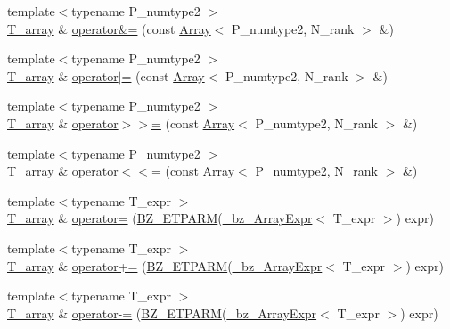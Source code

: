 \begin{DoxyCompactItemize}
{\footnotesize template$<$typename P\+\_\+numtype2 $>$ }\\\hyperlink{classArray_a6a3d9b6a214107a10df219091801f1e0}{T\+\_\+array} \& \hyperlink{classArray_a3098042fde0928d09b9aed56ce3566d0}{operator\&=} (const \hyperlink{classArray}{Array}$<$ P\+\_\+numtype2, N\+\_\+rank $>$ \&)
\item 
{\footnotesize template$<$typename P\+\_\+numtype2 $>$ }\\\hyperlink{classArray_a6a3d9b6a214107a10df219091801f1e0}{T\+\_\+array} \& \hyperlink{classArray_a563ef064015d737b7fda4b2235e113cf}{operator$\vert$=} (const \hyperlink{classArray}{Array}$<$ P\+\_\+numtype2, N\+\_\+rank $>$ \&)
\item 
{\footnotesize template$<$typename P\+\_\+numtype2 $>$ }\\\hyperlink{classArray_a6a3d9b6a214107a10df219091801f1e0}{T\+\_\+array} \& \hyperlink{classArray_aa39a45159f95d641f68736622006ca4d}{operator$>$$>$=} (const \hyperlink{classArray}{Array}$<$ P\+\_\+numtype2, N\+\_\+rank $>$ \&)
\item 
{\footnotesize template$<$typename P\+\_\+numtype2 $>$ }\\\hyperlink{classArray_a6a3d9b6a214107a10df219091801f1e0}{T\+\_\+array} \& \hyperlink{classArray_aa3af1f046567cfdefc17db7a0caebd5d}{operator$<$$<$=} (const \hyperlink{classArray}{Array}$<$ P\+\_\+numtype2, N\+\_\+rank $>$ \&)
\item 
{\footnotesize template$<$typename T\+\_\+expr $>$ }\\\hyperlink{classArray_a6a3d9b6a214107a10df219091801f1e0}{T\+\_\+array} \& \hyperlink{classArray_a1c57180d325b73bc6808e8aa8cad0c2b}{operator=} (\hyperlink{tuning_8h_a92a6f3aa8f4cd5ac9b4239c449892bb7}{B\+Z\+\_\+\+E\+T\+P\+A\+R\+M}(\hyperlink{class__bz__ArrayExpr}{\+\_\+bz\+\_\+\+Array\+Expr}$<$ T\+\_\+expr $>$) expr)
\item 
{\footnotesize template$<$typename T\+\_\+expr $>$ }\\\hyperlink{classArray_a6a3d9b6a214107a10df219091801f1e0}{T\+\_\+array} \& \hyperlink{classArray_ac020754f238788bc5dec09a752a7645d}{operator+=} (\hyperlink{tuning_8h_a92a6f3aa8f4cd5ac9b4239c449892bb7}{B\+Z\+\_\+\+E\+T\+P\+A\+R\+M}(\hyperlink{class__bz__ArrayExpr}{\+\_\+bz\+\_\+\+Array\+Expr}$<$ T\+\_\+expr $>$) expr)
\item 
{\footnotesize template$<$typename T\+\_\+expr $>$ }\\\hyperlink{classArray_a6a3d9b6a214107a10df219091801f1e0}{T\+\_\+array} \& \hyperlink{classArray_ad8f7e2c163da5b6137df6588b58f930d}{operator-\/=} (\hyperlink{tuning_8h_a92a6f3aa8f4cd5ac9b4239c449892bb7}{B\+Z\+\_\+\+E\+T\+P\+A\+R\+M}(\hyperlink{class__bz__ArrayExpr}{\+\_\+bz\+\_\+\+Array\+Expr}$<$ T\+\_\+expr $>$) expr)

\end{DoxyCompactItemize}

